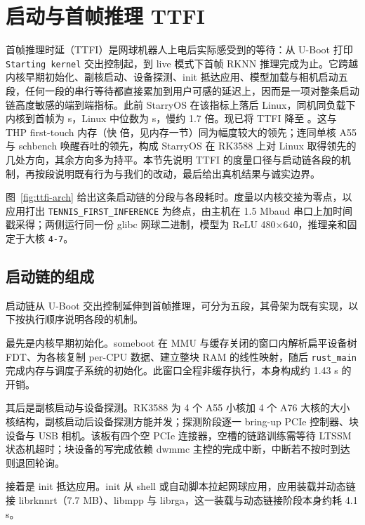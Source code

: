 \section{启动与首帧推理 TTFI}

首帧推理时延（TTFI）是网球机器人上电后实际感受到的等待：从 U-Boot 打印 \texttt{Starting kernel} 交出控制起，到 live 模式下首帧 RKNN 推理完成为止。它跨越内核早期初始化、副核启动、设备探测、init 抵达应用、模型加载与相机启动五段，任何一段的串行等待都直接累加到用户可感的延迟上，因而是一项对整条启动链高度敏感的端到端指标。此前 StarryOS 在该指标上落后 Linux，同机同负载下内核到首帧为 \nTtfiBefore{} s，Linux 中位数为 \nTtfiLin s，慢约 1.7 倍。现已将 TTFI 降至 。这与 THP first-touch 内存（快 \nThpRatio 倍，见内存一节）同为幅度较大的领先；连同单核 A55 与 schbench 唤醒吞吐的领先，构成 StarryOS 在 RK3588 上对 Linux 取得领先的几处方向，其余方向多为持平。本节先说明 TTFI 的度量口径与启动链各段的机制，再按段说明既有行为与我们的改动，最后给出真机结果与诚实边界。


图~\ref{fig:ttfi-arch} 给出这条启动链的分段与各段耗时。度量以内核交接为零点，以应用打出 \texttt{TENNIS\_FIRST\_INFERENCE} 为终点，由主机在 1.5 Mbaud 串口上加时间戳采得；两侧运行同一份 glibc 网球二进制，模型为 ReLU 480$\times$640，推理亲和固定于大核 \texttt{4-7}。

\subsection{启动链的组成}

启动链从 U-Boot 交出控制延伸到首帧推理，可分为五段，其骨架为既有实现，以下按执行顺序说明各段的机制。

最先是内核早期初始化。someboot 在 MMU 与缓存关闭的窗口内解析扁平设备树 FDT、为各核复制 per-CPU 数据、建立整块 RAM 的线性映射，随后 \texttt{rust\_main} 完成内存与调度子系统的初始化。此窗口全程非缓存执行，本身构成约 1.43 s 的开销。

其后是副核启动与设备探测。RK3588 为 4 个 A55 小核加 4 个 A76 大核的大小核结构，副核启动后设备探测方能并发；探测阶段逐一 bring-up PCIe 控制器、块设备与 USB 相机。该板有四个空 PCIe 连接器，空槽的链路训练需等待 LTSSM 状态机超时；块设备的写完成依赖 dwmmc 主控的完成中断，中断若不按时到达则退回轮询。

接着是 init 抵达应用。init 从 shell 或自动脚本拉起网球应用，应用装载并动态链接 librknnrt（7.7 MB）、libmpp 与 librga，这一装载与动态链接阶段本身约耗 4.1 s。

